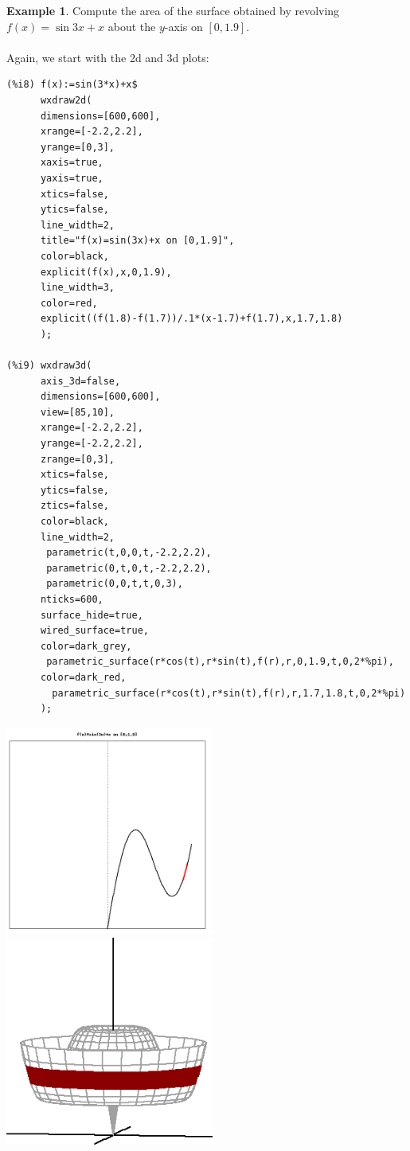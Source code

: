 \documentclass[10.5pt,twoside]{report}
\theoremstyle{definition}
\newtheorem{exmp}{Example}[section]
\begin{document}
\begin{exmp} Compute the area of the surface obtained by revolving $f(x)=\sin{3x}+x$ about the $y$-axis on $[0,1.9]$.\\

${}$\\

Again, we start with the 2d and 3d plots:

\begin{verbatim}
(%i8) f(x):=sin(3*x)+x$
      wxdraw2d(
      dimensions=[600,600],
      xrange=[-2.2,2.2],
      yrange=[0,3],
      xaxis=true,
      yaxis=true,
      xtics=false,
      ytics=false,
      line_width=2,
      title="f(x)=sin(3x)+x on [0,1.9]",
      color=black,
      explicit(f(x),x,0,1.9),
      line_width=3,
      color=red,
      explicit((f(1.8)-f(1.7))/.1*(x-1.7)+f(1.7),x,1.7,1.8)
      );

(%i9) wxdraw3d(  
      axis_3d=false,
      dimensions=[600,600],
      view=[85,10],
      xrange=[-2.2,2.2],
      yrange=[-2.2,2.2],
      zrange=[0,3],
      xtics=false,
      ytics=false,
      ztics=false,
      color=black,
      line_width=2,
       parametric(t,0,0,t,-2.2,2.2),
       parametric(0,t,0,t,-2.2,2.2),
       parametric(0,0,t,t,0,3),
      nticks=600,
      surface_hide=true,
      wired_surface=true,
      color=dark_grey,
       parametric_surface(r*cos(t),r*sin(t),f(r),r,0,1.9,t,0,2*%pi),
      color=dark_red,
        parametric_surface(r*cos(t),r*sin(t),f(r),r,1.7,1.8,t,0,2*%pi)
      );
\end{verbatim}

\includegraphics[width=2.7in]{example_3_4_2_1}
\includegraphics[width=2.7in]{example_3_4_2_2}


\end{exmp}
\end{document}
